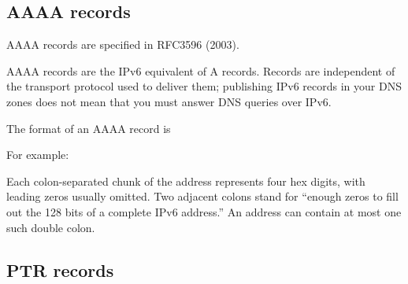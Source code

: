\protect\hypertarget{part0024_split_025.html}{}{}

\hypertarget{part0024_split_025.htmlux5cux23_idContainer1069}{}
\hypertarget{part0024_split_025.htmlux5cux23calibre_pb_24}{%
\subsection[AAAA
records]{\texorpdfstring{\protect\hypertarget{part0024_split_025.htmlux5cux23_idTextAnchor876}{}{}\protect\hypertarget{part0024_split_025.htmlux5cux23_idIndexMarker2075}{}{}\protect\hypertarget{part0024_split_025.htmlux5cux23_idIndexMarker2076}{}{}AAAA
records}{AAAA records}}\label{part0024_split_025.htmlux5cux23calibre_pb_24}}

\leavevmode\hypertarget{part0024_split_025.htmlux5cux23_idContainer944}{}%
AAAA records are specified in RFC3596 (2003).

\protect\hypertarget{part0024_split_025.htmlux5cux23_idIndexMarker2077}{}{}\protect\hypertarget{part0024_split_025.htmlux5cux23_idIndexMarker2078}{}{}\protect\hypertarget{part0024_split_025.htmlux5cux23_idIndexMarker2079}{}{}\protect\hypertarget{part0024_split_025.htmlux5cux23_idIndexMarker2080}{}{}AAAA
records are the IPv6 equivalent of A records. Records are independent of
the transport protocol used to deliver them; publishing IPv6 records in
your DNS zones does not mean that you must answer DNS queries over IPv6.

The format of an AAAA record is


\protect\hypertarget{part0024_split_025.htmlux5cux23_idTextAnchor877}{}{}For
example:


Each colon-separated chunk of the address represents four hex digits,
with leading zeros usually omitted. Two adjacent colons stand for
``enough zeros to fill out the 128 bits of a complete IPv6 address.'' An
address can contain at most one such double colon.

\protect\hypertarget{part0024_split_026.html}{}{}

\hypertarget{part0024_split_026.htmlux5cux23_idContainer1069}{}
\hypertarget{part0024_split_026.htmlux5cux23calibre_pb_25}{%
\subsection[PTR
records]{\texorpdfstring{\protect\hypertarget{part0024_split_026.htmlux5cux23_idTextAnchor878}{}{}\protect\hypertarget{part0024_split_026.htmlux5cux23_idIndexMarker2081}{}{}\protect\hypertarget{part0024_split_026.htmlux5cux23_idTextAnchor879}{}{}PTR
records}{PTR records}}\label{part0024_split_026.htmlux5cux23calibre_pb_25}}

